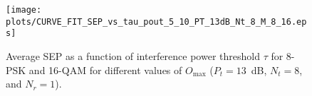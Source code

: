 \documentclass[12pt,draftcls,peerreview,onecolumn]{IEEEtran}
\newcommand{\lam}{\lambda}
\newcommand{\Nt}{{N_t}}
\newcommand{\Nr}{{N_r}}
\newcommand{\Pt}{{P_t}}
\newcommand{\outmax}{O_{\text{max}}}
\newcommand{\itau}{\tau}
\newcommand{\cone}{c_{1}}
\newcommand{\m}{\cone}
\begin{document}
\begin{figure}
	\centering \texttt{[image: plots/CURVE\_FIT\_SEP\_vs\_tau\_pout\_5\_10\_PT\_13dB\_Nt\_8\_M\_8\_16.eps]}
	\caption{Average SEP as a function of interference power threshold $\itau$ for 8-PSK and 16-QAM for different values of $\outmax$ ($\Pt = 13$~dB, $\Nt=8$, and $\Nr=1$).}
	\label{fig:SEP_vs_tau_QAM}
\end{figure}




\end{document}
